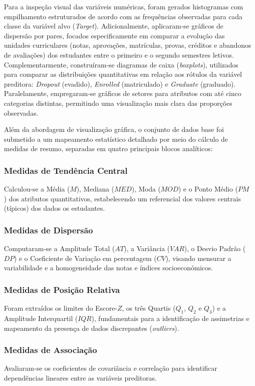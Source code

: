 Para a inspeção visual das variáveis numéricas, foram gerados histogramas com empilhamento estruturados de acordo com as frequências observadas para cada classe da variável alvo (\textit{Target}). Adicionalmente, aplicaram-se gráficos de dispersão por pares, focados especificamente em comparar a evolução das unidades curriculares (notas, aprovações, matrículas, provas, créditos e abandonos de avaliações) dos estudantes entre o primeiro e o segundo semestres letivos. Complementarmente, construíram-se diagramas de caixa (\textit{boxplots}), utilizados para comparar as distribuições quantitativas em relação aos rótulos da variável preditora: \textit{Dropout} (evadido), \textit{Enrolled} (matriculado) e \textit{Graduate} (graduado). Paralelamente, empregaram-se gráficos de setores para atributos com até cinco categorias distintas, permitindo uma visualização mais clara das proporções observadas.

Além da abordagem de visualização gráfica, o conjunto de dados base foi submetido a um mapeamento estatístico detalhado por meio do cálculo de medidas de resumo, separadas em quatro principais blocos analíticos:

\subsubsection{Medidas de Tendência Central}
Calculou-se a Média ($M$), Mediana ($MED$), Moda ($MOD$) e o Ponto Médio ($PM$) dos atributos quantitativos, estabelecendo um referencial dos valores centrais (típicos) dos dados os estudantes.

\subsubsection{Medidas de Dispersão}
Computaram-se a Amplitude Total ($AT$), a Variância ($VAR$), o Desvio Padrão ($DP$) e o Coeficiente de Variação em percentagem ($CV$), visando mensurar a variabilidade e a homogeneidade das notas e índices socioeconómicos.

\subsubsection{Medidas de Posição Relativa}
Foram extraídos os limites do Escore-$Z$, os três Quartis ($Q_1$, $Q_2$ e $Q_3$) e a Amplitude Interquartil ($IQR$), fundamentais para a identificação de assimetrias e mapeamento da presença de dados discrepantes (\textit{outliers}).

\subsubsection{Medidas de Associação}
Avaliaram-se os coeficientes de covariância e correlação para identificar dependências lineares entre as variáveis preditoras.

